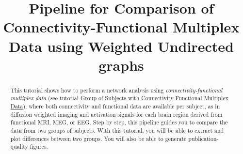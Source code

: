 \documentclass[justified]{tufte-handout}
\title[Comparison of Connectivity-Functional Multiplex Data using WU]{Pipeline for Comparison of Connectivity-Functional Multiplex Data using Weighted Undirected graphs}
\begin{document}
\maketitle

\begin{abstract}
\noindent
This tutorial shows how to perform a network analysis using \emph{connectivity-functional multiplex data} (see tutorial \href{https://github.com/braph-software/BRAPH-2/tree/develop/tutorials/data/tut_gr_con_fun_mp}{Group of Subjects with Connectivity-Functional Multiplex Data}), where both connectivity and functional data are available per subject, as in diffusion weighted imaging and activation signals for each brain region derived from functional MRI, MEG, or EEG. Step by step, this pipeline guides you to compare the data from two groups of subjects.  With this tutorial, you will be able to extract and plot differences between two groups. You will also be able to generate publication-quality figures.
\end{abstract}
\end{document}
